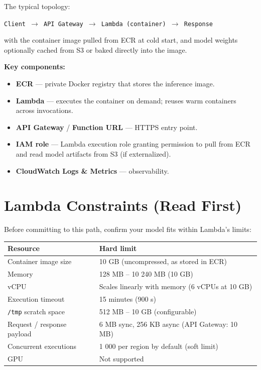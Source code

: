 \documentclass[11pt,a4paper]{article}
\begin{document}
The typical topology:

\begin{center}
\texttt{Client $\rightarrow$ API Gateway $\rightarrow$ Lambda (container) $\rightarrow$ Response}
\end{center}

with the container image pulled from ECR at cold start, and model weights
optionally cached from S3 or baked directly into the image.

\textbf{Key components:}
\begin{itemize}[leftmargin=*,nosep]
    \item \textbf{ECR} --- private Docker registry that stores the inference image.
    \item \textbf{Lambda} --- executes the container on demand; reuses warm
          containers across invocations.
    \item \textbf{API Gateway} / \textbf{Function URL} --- HTTPS entry point.
    \item \textbf{IAM role} --- Lambda execution role granting permission to
          pull from ECR and read model artifacts from S3 (if externalized).
    \item \textbf{CloudWatch Logs \& Metrics} --- observability.
\end{itemize}

\section{Lambda Constraints (Read First)}

Before committing to this path, confirm your model fits within Lambda's limits:

\begin{longtable}{p{5cm} p{9.5cm}}
\toprule
\textbf{Resource} & \textbf{Hard limit} \\
\midrule
Container image size & 10 GB (uncompressed, as stored in ECR) \\
\addlinespace
Memory & 128 MB -- 10 240 MB (10 GB) \\
\addlinespace
vCPU & Scales linearly with memory (6 vCPUs at 10 GB) \\
\addlinespace
Execution timeout & 15 minutes (900 s) \\
\addlinespace
\texttt{/tmp} scratch space & 512 MB -- 10 GB (configurable) \\
\addlinespace
Request / response payload & 6 MB sync, 256 KB async (API Gateway: 10 MB) \\
\addlinespace
Concurrent executions & 1 000 per region by default (soft limit) \\
\addlinespace
GPU & Not supported \\
\bottomrule
\end{longtable}
\end{document}
